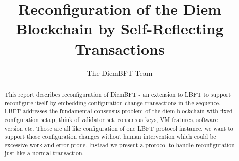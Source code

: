 \documentclass[letterpaper,10pt]{article}
\newcommand{\LBFT}{LBFT\xspace}
\begin{document}
\title{Reconfiguration of the Diem Blockchain by Self-Reflecting Transactions}
\author{The DiemBFT Team}
\date{}
\maketitle


\newcommand{\myomit}[1]{}

\begin{abstract}
This report describes reconfiguration of DiemBFT - an extension to \LBFT to support reconfigure itself
 by embedding configuration-change transactions in the sequence.
\LBFT addresses the fundamental consensus problem of the diem blockchain with fixed configuration setup,
think of validator set, consensus keys, VM features, software version etc.
Those are all like configuration of one \LBFT protocol instance. we want to support those configuration changes
without human intervention which could be excessive work and error prone. Instead we present
a protocol to handle reconfiguration just like a normal transaction.
\end{abstract}






\begingroup


\endgroup
\end{document}
